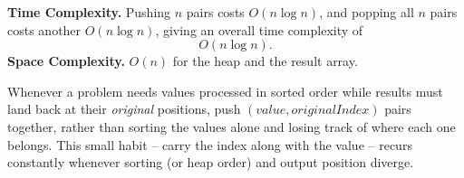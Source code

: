 \begin{complexitybox}
\textbf{Time Complexity.} Pushing $n$ pairs costs $O(n \log n)$, and
popping all $n$ pairs costs another $O(n \log n)$, giving an overall time
complexity of
\[
  O(n \log n).
\]
\textbf{Space Complexity.} $O(n)$ for the heap and the result array.
\end{complexitybox}

\begin{takeawaybox}
Whenever a problem needs values processed in sorted order while results
must land back at their \emph{original} positions, push
$(\textit{value}, \textit{originalIndex})$ pairs together, rather than
sorting the values alone and losing track of where each one belongs. This
small habit -- carry the index along with the value -- recurs constantly
whenever sorting (or heap order) and output position diverge.
\end{takeawaybox}
